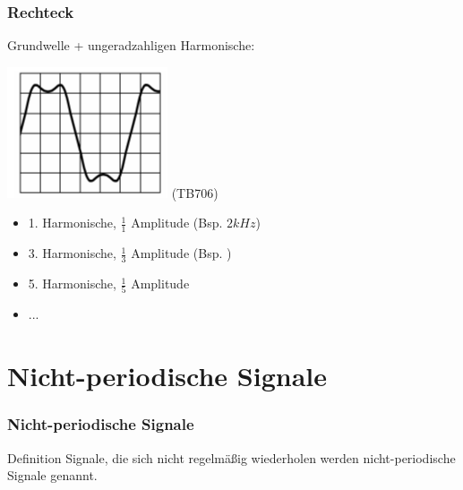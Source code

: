 \begin{frame}
  \frametitle{Rechteck}

  Grundwelle + ungeradzahligen Harmonische:


  \begin{center}
    \includegraphics[width=\textwidth,height=0.5\textheight,keepaspectratio]{a11/TB706.png}
    \tiny (TB706)
  \end{center}

  \begin{itemize}
    \item 1. Harmonische, $\frac{1}{1}$ Amplitude (Bsp. $2kHz$)
    \item 3. Harmonische, $\frac{1}{3}$ Amplitude (Bsp. 
      )
    \item 5. Harmonische, $\frac{1}{5}$ Amplitude
    \item ...
  \end{itemize}


\end{frame}

\section{Nicht-periodische Signale}

\begin{frame}
  \frametitle{Nicht-periodische Signale}

  \begin{block}{Definition}
    Signale, die sich nicht regelmäßig wiederholen werden nicht-periodische Signale genannt.
  \end{block}

\end{frame}

